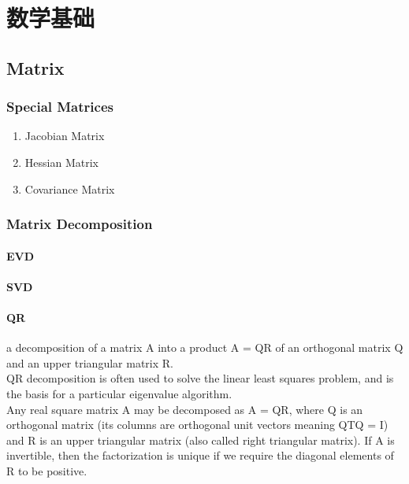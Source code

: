 \chapter{数学基础}

\section{Matrix}

\subsection{Special Matrices}
\begin{enumerate}
\item Jacobian Matrix
\item Hessian Matrix
\item Covariance Matrix
\end{enumerate}

\subsection{Matrix Decomposition}

\subsubsection{EVD} 

\subsubsection{SVD} 

\subsubsection{QR} 
a decomposition of a matrix A into a product A = QR of an orthogonal matrix Q and an upper triangular matrix R.  \\

QR decomposition is often used to solve the linear least squares problem, and is the basis for a particular eigenvalue algorithm. \\

Any real square matrix A may be decomposed as A = QR, where Q is an orthogonal matrix (its columns are orthogonal unit vectors meaning QTQ = I) and R is an upper triangular matrix (also called right triangular matrix).  If A is invertible, then the factorization is unique if we require the diagonal elements of R to be positive. \\


